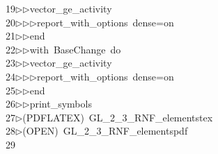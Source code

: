 \begin{tabbing}
19\>$\triangleright$\>$\triangleright$\>vector\_ge\_activity\ \\[0pt]
20\>$\triangleright$\>$\triangleright$\>$\triangleright$\>report\_with\_options\ dense=on\ \\[0pt]
21\>$\triangleright$\>$\triangleright$\>end\ \\[0pt]
22\>$\triangleright$\>$\triangleright$\>with\ BaseChange\ do\ \\[0pt]
23\>$\triangleright$\>$\triangleright$\>vector\_ge\_activity\ \\[0pt]
24\>$\triangleright$\>$\triangleright$\>$\triangleright$\>report\_with\_options\ dense=on\ \\[0pt]
25\>$\triangleright$\>$\triangleright$\>end\ \\[0pt]
26\>$\triangleright$\>$\triangleright$\>print\_symbols\\[0pt]
27\>$\triangleright$\>(PDFLATEX)\ GL\_2\_3\_RNF\_elementstex\\[0pt]
28\>$\triangleright$\>(OPEN)\ GL\_2\_3\_RNF\_elementspdf\\[0pt]
29\>\end{tabbing}
